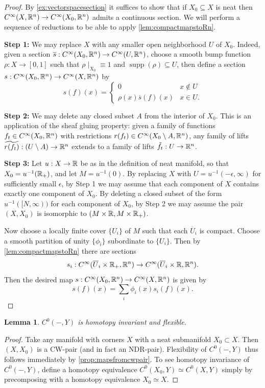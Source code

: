 \documentclass{article}
\newtheorem{lemma}[theorem]{Lemma}
\newtheorem{proposed work}[theorem]{Proposed Work}
\begin{document}
\begin{proof}
  By \ref{ex:vectorspacesection} it suffices to show that if
  $X_0\subseteq X$ is neat then
  $C^\infty(X,\mathbb R^n) \to C^\infty(X_0, \mathbb R^n)$ admits a continuous
  section. We will perform a sequence of reductions to be able to
  apply \ref{lem:compactmapstoRn}.

  {\bf Step 1:} We may replace $X$ with any smaller open neighborhood
  $U$ of $X_0$. Indeed, given a section $\overline s: C^\infty(X_0,
  \mathbb R^n) \to C^\infty(U, \mathbb R^n)$, choose a smooth bump function
  $\rho: X\to [0,1]$ such that $\rho\mid_{X_0} \equiv 1$ and
  $\operatorname{supp}(\rho)\subseteq U$, then define a section
  $s:C^\infty(X_0, \mathbb R^n) \to C^\infty(X, \mathbb R^n)$ by
  \[
    s(f)(x) = \begin{cases} 0 &x\notin U\\ \rho(x) \overline s(f)(x) & x\in
      U. 
    \end{cases}
  \]

  {\bf Step 2:} We may delete any closed subset $A$ from the interior
  of $X_0$. This is an application of the sheaf gluing property: given
  a family of functions $f_t \in C^\infty(X_0, \mathbb R^n)$ with
  restrictions $r(f_t) \in C^\infty(X_0\setminus A, \mathbb R^n)$, any family
  of lifts $\widetilde{r(f_t)} : (U\setminus A)\to \mathbb R^n$ extends to a
  family of lifts $\tilde f_t : U\to \mathbb R^n$.

  {\bf Step 3:} Let $u:X\to \mathbb R$ be as in the definition of neat
  manifold, so that $X_0 = u^{-1}(\mathbb R_+)$, and let $M = u^{-1}(0)$. By
  replacing $X$ with $U = u^{-1}(-\epsilon,\infty)$ for sufficiently
  small $\epsilon$, by Step 1 we may assume that each component of $X$
  contains exactly one component of $X_0$. By deleting a closed subset
  of the form $u^{-1}([N,\infty))$ for each component of $X_0$, by
  Step 2 we may assume the pair $(X, X_0)$ is isomorphic to $(M\times
  \mathbb R, M\times \mathbb R_+)$.

  Now choose a locally finite cover $\{U_i\}$ of $M$ such that each
  $\overline U_i$ is compact. Choose a smooth partition of unity
  $\{\phi_i\}$ subordinate to $\{U_i\}$. Then by
  \ref{lem:compactmapstoRn} there are sections 
  \[ s_i : C^\infty(\overline U_i\times \mathbb R_+, \mathbb R^n) \to C^\infty(\overline
    U_i\times \mathbb R, \mathbb R^n).\]
  Then the desired map $s: C^\infty(X_0,\mathbb R^n) \to C^\infty(X, \mathbb R^n)$
  is given by
  \[
    s(f)(x) = \sum_i \phi_i(x) s_i(f)(x).
  \]
\end{proof}

\begin{lemma} \label{lem:c0functorisnice}
  $C^0(-, Y)$ is homotopy invariant and flexible.
\end{lemma}
\begin{proof}
  Take any manifold with corners $X$ with a neat submanifold
  $X_0 \subset X$. Then $(X, X_0)$ is a CW-pair (and in fact an
  NDR-pair).
  Flexibility of $C^0(-,Y)$ thus follows immediately by
  \ref{prop:mapsfromcwpair}. To see homotopy invariance of $C^0(-,Y)$,
  define a homotopy equivalence $C^0(X_0, Y) \simeq C^0(X,Y)$ simply
  by precomposing with a homotopy equivalence $X_0 \simeq X$.
\end{proof}
\end{document}
